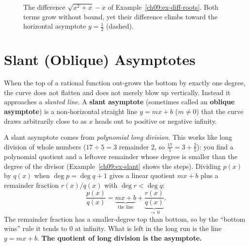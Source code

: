 \begin{figure}[htbp]
\centering
{}
\caption{The difference $\sqrt{x^2+x}-x$ of Example~\ref{ch09:ex-diff-roots}.
Both terms grow without bound, yet their difference climbs toward the
horizontal asymptote $y=\tfrac12$ (dashed).}
\label{ch09:fig-diff-roots}
\end{figure}

\section{Slant (Oblique) Asymptotes}
\label{ch09:slant}

When the top of a rational function out-grows the bottom by exactly one degree,
the curve does not flatten and does not merely blow up vertically. Instead it
approaches a \emph{slanted line}.
A \textbf{slant asymptote} (sometimes called an \textbf{oblique
asymptote}) is a non-horizontal straight line $y=mx+b$ ($m\ne 0$) that the
curve draws arbitrarily close to as $x$ heads out to positive or negative
infinity.

\begin{intuitionbox}
A slant asymptote comes from \emph{polynomial long division}. This works like
long division of whole numbers ($17 \div 5 = 3$ remainder $2$, so
$\tfrac{17}{5} = 3 + \tfrac25$): you find a polynomial quotient and a leftover
remainder whose degree is smaller than the degree of the divisor
(Example~\ref{ch09:ex-slant} shows the steps). Dividing
$p(x)$ by $q(x)$ when $\deg p = \deg q + 1$ gives a linear quotient $mx+b$ plus a
remainder fraction $r(x)/q(x)$ with $\deg r < \deg q$:
\[
   \frac{p(x)}{q(x)} = \underbrace{mx+b}_{\text{the line}}
   + \underbrace{\frac{r(x)}{q(x)}}_{\to\, 0}.
\]
The remainder fraction has a smaller-degree top than bottom, so by the ``bottom
wins'' rule it tends to $0$ at infinity. What is left in the long run is the
line $y=mx+b$. \textbf{The quotient of long division is the asymptote.}
\end{intuitionbox}

